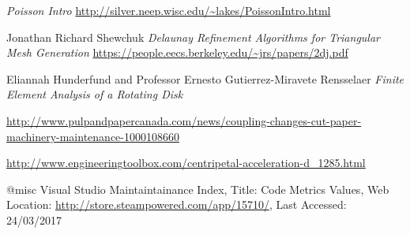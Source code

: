 \begin{changemargin}{\CMwidth}{\CMheight}
\begin{thebibliography}{9}
 \emph{Poisson Intro} \url{http://silver.neep.wisc.edu/~lakes/PoissonIntro.html}

 Jonathan Richard Shewchuk \emph{Delaunay Refinement Algorithms
for Triangular Mesh Generation} \url{https://people.eecs.berkeley.edu/~jrs/papers/2dj.pdf}

 Eliannah Hunderfund and Professor Ernesto Gutierrez-Miravete Rensselaer 
\emph{Finite Element Analysis of a Rotating Disk}


 \url{http://www.pulpandpapercanada.com/news/coupling-changes-cut-paper-machinery-maintenance-1000108660}

 \url{http://www.engineeringtoolbox.com/centripetal-acceleration-d_1285.html}


 @misc{ Visual Studio Maintaintainance Index,
  {Title: Code Metrics Values},
  {Web Location: \url{http://store.steampowered.com/app/15710/}},
  {Last Accessed: 24/03/2017}}
	


\end{thebibliography}
\end{changemargin}
